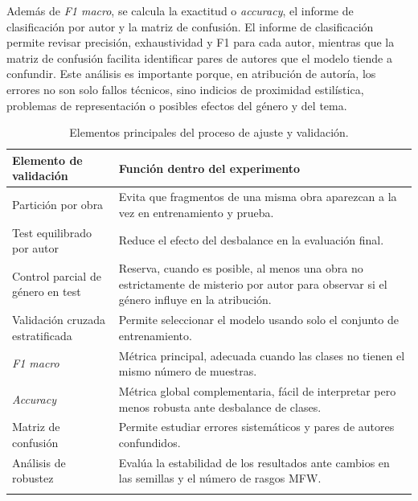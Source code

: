 \documentclass[IB]{TFUOC}%
\begin{document}
Además de \textit{F1 macro}, se calcula la exactitud o \textit{accuracy}, el informe de clasificación por autor y la matriz de confusión. El informe de clasificación permite revisar precisión, exhaustividad y F1 para cada autor, mientras que la matriz de confusión facilita identificar pares de autores que el modelo tiende a confundir. Este análisis es importante porque, en atribución de autoría, los errores no son solo fallos técnicos, sino indicios de proximidad estilística, problemas de representación o posibles efectos del género y del tema.

\begin{longtable}{|p{4.7cm}|p{10.5cm}|}
\hline
\textbf{Elemento de validación} & \textbf{Función dentro del experimento} \\
\hline

Partición por obra &
Evita que fragmentos de una misma obra aparezcan a la vez en entrenamiento y prueba. \\
\hline

Test equilibrado por autor &
Reduce el efecto del desbalance en la evaluación final. \\
\hline

Control parcial de género en test &
Reserva, cuando es posible, al menos una obra no estrictamente de misterio por autor para observar si el género influye en la atribución. \\
\hline

Validación cruzada estratificada &
Permite seleccionar el modelo usando solo el conjunto de entrenamiento. \\
\hline

\textit{F1 macro} &
Métrica principal, adecuada cuando las clases no tienen el mismo número de muestras. \\
\hline

\textit{Accuracy} &
Métrica global complementaria, fácil de interpretar pero menos robusta ante desbalance de clases. \\
\hline

Matriz de confusión &
Permite estudiar errores sistemáticos y pares de autores confundidos. \\
\hline

Análisis de robustez &
Evalúa la estabilidad de los resultados ante cambios en las semillas y el número de rasgos MFW. \\
\hline

\caption{Elementos principales del proceso de ajuste y validación.}
\label{tab:ajuste-validacion}
\end{longtable}
\end{document}
